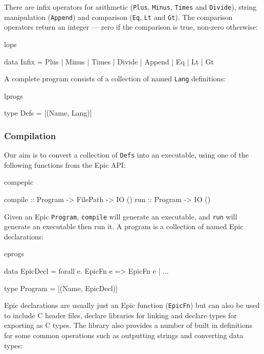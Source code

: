 \noindent
There are infix operators for arithmetic (\texttt{Plus},
\texttt{Minus}, \texttt{Times} and \texttt{Divide}), string
manipulation (\texttt{Append}) and comparison (\texttt{Eq},
\texttt{Lt} and \texttt{Gt}). The comparison operators return an
integer --- zero if the comparison is true, non-zero otherwise:

\begin{SaveVerbatim}{lops}

data Infix = Plus | Minus | Times | Divide | Append
           | Eq   | Lt    | Gt

\end{SaveVerbatim}

\noindent
A complete program consists of a collection of named \texttt{Lang}
definitions:

\begin{SaveVerbatim}{lprogs}

type Defs = [(Name, Lang)]

\end{SaveVerbatim}

\subsubsection{Compilation}

Our aim is to convert a collection of \texttt{Defs} into an
executable, using one of the following functions from the Epic API:

\begin{SaveVerbatim}{compepic}

compile :: Program -> FilePath -> IO ()
run     :: Program -> IO ()

\end{SaveVerbatim}

\noindent
Given an Epic \texttt{Program}, \texttt{compile} will generate an
executable, and \texttt{run} will generate an executable then run it.
A program is a collection of named Epic declarations:

\begin{SaveVerbatim}{eprogs}

data EpicDecl = forall e. EpicFn e => EpicFn e
              | ...

type Program = [(Name, EpicDecl)]

\end{SaveVerbatim}

\noindent
Epic declarations are usually just an Epic function (\texttt{EpicFn})
but can also be used to include C header files, declare libraries for
linking and declare types for exporting as C types. The library also
provides a number of built in definitions for some common operations
such as outputting strings and converting data types:

